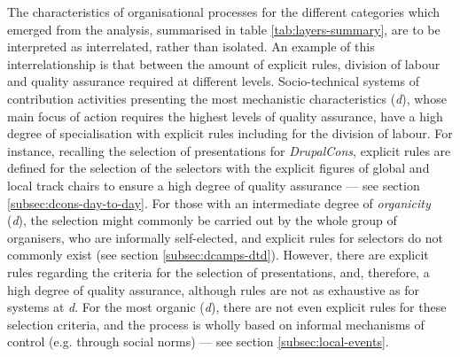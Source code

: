 The characteristics of organisational processes for the different categories which emerged from the analysis, summarised in table \ref{tab:layers-summary}, are to be interpreted as interrelated, rather than isolated. An example of this interrelationship is that between the amount of explicit rules, division of labour and quality assurance required at different levels. Socio-technical systems of contribution activities presenting the most mechanistic characteristics (\textsl{d}), whose main focus of action requires the highest levels of quality assurance, have a high degree of specialisation with explicit rules including for the division of labour. For instance, recalling the selection of presentations for \textit{DrupalCons}, explicit rules are defined for the selection of the selectors with the explicit figures of global and local track chairs to ensure a high degree of quality assurance --- see section \ref{subsec:dcons-day-to-day}. For those with an intermediate degree of \textit{organicity} (\textsl{d}), the selection might commonly be carried out by the whole group of organisers, who are informally self-elected, and explicit rules for selectors do not commonly exist (see section \ref{subsec:dcamps-dtd}). However, there are explicit rules regarding the criteria for the selection of presentations, and, therefore, a high degree of quality assurance, although rules are not as exhaustive as for systems at \textsl{d}. For the most organic (\textsl{d}), there are not even explicit rules for these selection criteria, and the process is wholly based on informal mechanisms of control (e.g. through social norms) --- see section \ref{subsec:local-events}.

